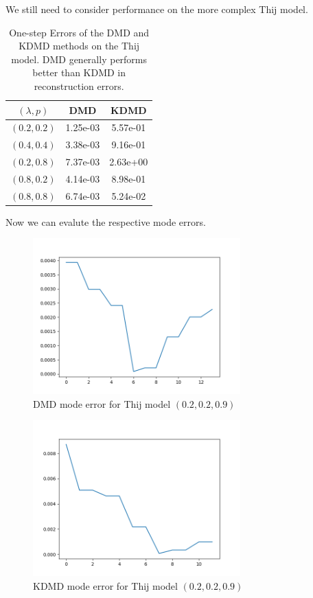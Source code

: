 \FloatBarrier

We still need to consider performance on the more complex Thij model.


\begin{table}
    \centering
    \begin{tabular}{||c c c ||} 
    \hline
    $(\lambda,p)$ & DMD & KDMD  \\ [0.5ex] 
    \hline\hline
    $(0.2,0.2)$ & 1.25e-03 &  5.57e-01\\ 
    \hline
    $(0.4,0.4)$ & 3.38e-03 & 9.16e-01 \\
    \hline
    $(0.2,0.8)$ & 7.37e-03 & 2.63e+00 \\
    \hline
    $(0.8,0.2)$ & 4.14e-03 & 8.98e-01\\
    \hline
    $(0.8,0.8)$ & 6.74e-03 &  5.24e-02 \\
    \hline
   \end{tabular}
   \caption{One-step Errors of the DMD and KDMD methods on the Thij model.
   DMD generally performs better than KDMD in reconstruction errors.}
   \label{table:15}
\end{table}

Now we can evalute the respective mode errors.

\begin{figure}
    \includegraphics[width=8cm]{Images/mode_error_dmd_twitter_020209.png}
    \centering
    \caption{DMD mode error for Thij model $(0.2,0.2,0.9)$}
\end{figure}

\begin{figure}
    \includegraphics[width=8cm]{Images/mode_error_kdmd_twitter_020209.png}
    \centering
    \caption{KDMD mode error for Thij model $(0.2,0.2,0.9)$}
\end{figure}


